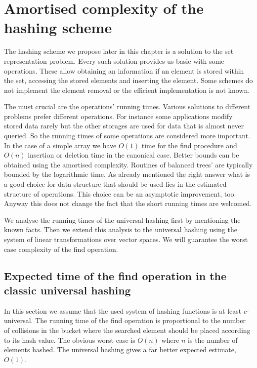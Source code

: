 \chapter{Amortised complexity of the hashing scheme}

The hashing scheme we propose later in this chapter is a solution to the set representation problem. Every such solution provides us basic with some operations. These allow obtaining an information if an element is stored within the set, accessing the stored elements and inserting the element. Some schemes do not implement the element removal or the efficient implementation is not known.

The must crucial are the operations' running times. Various solutions to different problems prefer different operations. For instance some applications modify stored data rarely but the other storages are used for data that is almost never queried. So the running times of some operations are considered more important. In the case of a simple array we have $O(1)$ time for the find procedure and $O(n)$ insertion or deletion time in the canonical case. Better bounds can be obtained using the amortised complexity. Routines of balanced trees' are typically bounded by the logarithmic time. As already mentioned the right answer what is a good choice for data structure that should be used lies in the estimated structure of operations. This choice can be an asymptotic improvement, too. Anyway this does not change the fact that the short running times are welcomed.

We analyse the running times of the universal hashing first by mentioning the known facts. Then we extend this analysis to the universal hashing using the system of linear transformations over vector spaces. We will guarantee the worst case complexity of the find operation.

\section{Expected time of the find operation in the classic universal hashing}
In this section we assume that the used system of hashing functions is at least $c$-universal. The running time of the find operation is proportional to the number of collisions in the bucket where the searched element should be placed according to its hash value. The obvious worst case is $O(n)$ where $n$ is the number of elements hashed. The universal hashing gives a far better expected estimate, $O(1)$.

